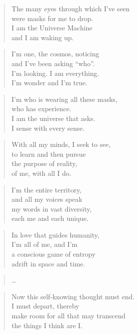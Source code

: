 \documentclass[10pt,a4paper]{article}
\begin{document}
\begin{multicols}{2}
\begin{verse}
The many eyes through which I’ve seen\\
were masks for me to drop.\\
I am the Universe Machine\\
and I am waking up.
\end{verse}

\begin{verse}
I’m one, the cosmos, noticing\\
and I’ve been asking “who”.\\
I’m looking. I am everything.\\
I’m wonder and I’m true.
\end{verse}

\begin{verse}
I’m who is wearing all these masks,\\
who has experience.\\
I am the universe that asks.\\
I sense with every sense.
\end{verse}

\begin{verse}
With all my minds, I seek to see,\\
to learn and then pursue\\
the purpose of reality,\\
of me, with all I do.
\end{verse}

\begin{verse}
I’m the entire territory,\\
and all my voices speak\\
my words in vast diversity,\\
each me and each unique.
\end{verse}

\begin{verse}
In love that guides humanity,\\
I’m all of me, and I’m\\
a conscious game of entropy\\
adrift in space and time.
\end{verse}

\begin{verse}
\ldots
\end{verse}

\begin{verse}
Now this self-knowing thought must end.\\
I must depart, thereby\\
make room for all that may transcend\\
the things I think are I.
\end{verse}


\end{multicols}
\end{document}
